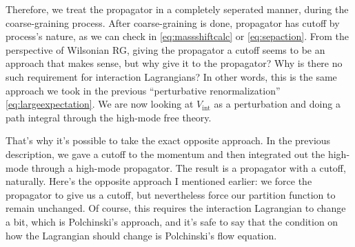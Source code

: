 \documentclass[12pt,halfline,a4paper]{ouparticle}
\begin{document}
Therefore, we treat the propagator in a completely seperated manner, during the coarse-graining process.
After coarse-graining is done, propagator has cutoff by process's nature, as we can check in \ref{eq:massshiftcalc} or \ref{eq:sepaction}. 
From the perspective of Wilsonian RG, giving the propagator a cutoff seems to be an approach that makes sense, but why give it to the propagator? Why is there no such requirement for interaction Lagrangians? 
In other words, this is the same approach we took in the previous “perturbative renormalization” \ref{eq:largeexpectation}. We are now looking at $V_\text{int}$ as a perturbation and doing a path integral through the high-mode free theory.

That's why it's possible to take the exact opposite approach. In the previous description, we gave a cutoff to the momentum and then integrated out the high-mode through a high-mode propagator. The result is a propagator with a cutoff, naturally. 
Here's the opposite approach I mentioned earlier: we force the propagator to give us a cutoff, but nevertheless force our partition function to remain unchanged. Of course, this requires the interaction Lagrangian to change a bit, which is Polchinski's approach, and it's safe to say that the condition on how the Lagrangian should change is Polchinski's flow equation.
\end{document}
